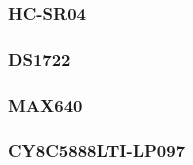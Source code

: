 \documentclass[12pt,a4paper]{article}
\begin{document}
	\subsubsection{HC-SR04}
	

	\subsubsection{DS1722}
	

	\subsubsection{MAX640}
	

	\subsubsection{CY8C5888LTI-LP097}
	

\fi %
\end{document}
